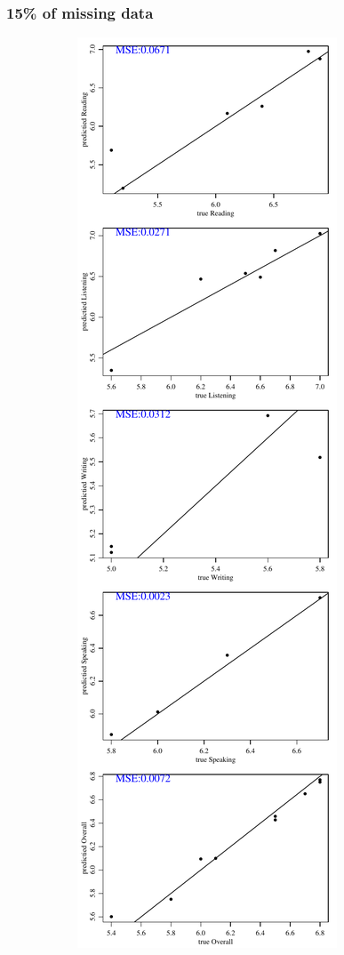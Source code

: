 \documentclass[12pt]{article}
\begin{document}
\subsubsection{15\% of missing data}
\begin{figure}[h!]
\centering
\begin{subfigure}{0.4\textwidth}
    \includegraphics[height=.85\textheight]{pic/0.15/EM_PredvsTrue.pdf}

\end{subfigure}
\end{figure}
\end{document}
